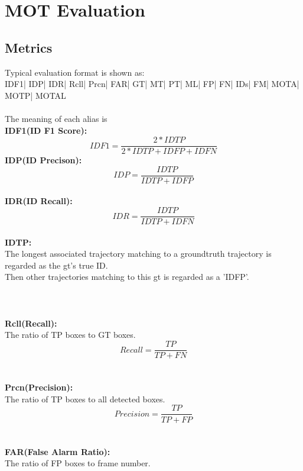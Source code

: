         \section{MOT Evaluation}            
            \subsection{Metrics}            
                Typical evaluation format is shown as:\\             
                IDF1| IDP| IDR| Rcll| Prcn| FAR| GT| MT| PT| ML| FP| FN| IDs| FM| MOTA| MOTP| MOTAL\\\\
                The meaning of each alias is\\
                \textbf{IDF1(ID F1 Score):}\\
                $$IDF1=\frac{2 *IDTP} {2 * IDTP + IDFP + IDFN}$$
                \textbf{IDP(ID Precison):}\\
                $$IDP=\frac{IDTP}{IDTP +IDFP}$$                
                \\\textbf{IDR(ID Recall):}\\
                $$IDR = \frac{IDTP}{IDTP +IDFN}$$
                \\\textbf{IDTP:}\\
                The longest associated trajectory matching to a groundtruth trajectory is regarded as the gt's true ID.\\
                Then other trajectories matching to this gt is regarded as a 'IDFP'.\\
                \\\\\\\textbf{Rcll(Recall):}\\
                The ratio of TP boxes to GT boxes.\\
                $$Recall=\frac{TP}{TP + FN}$$\\
                \\\textbf{Prcn(Precision):}\\
                The ratio of TP boxes to all detected boxes.\\
                $$Precision=\frac{TP}{TP + FP}$$\\
                \\\textbf{FAR(False Alarm Ratio):}\\
                The ratio of FP boxes to frame number.\\
